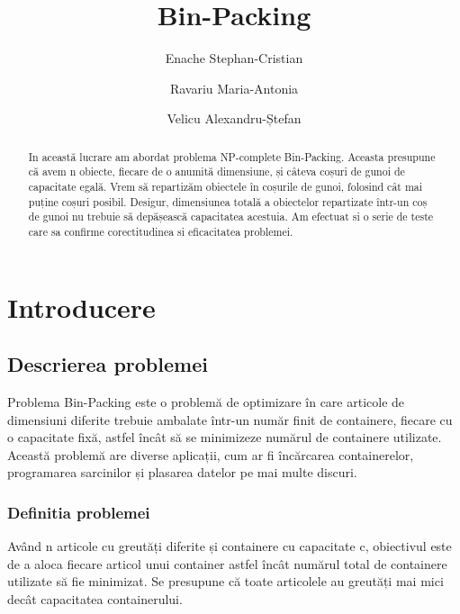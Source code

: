 \documentclass[runningheads]{llncs}
\begin{document}
	\title{Bin-Packing}

	\author{Enache Stephan-Cristian\and
		Ravariu Maria-Antonia\and
		Velicu Alexandru-Ștefan}

	\maketitle
	\begin{abstract}
		In această lucrare am abordat problema NP-complete Bin-Packing. Aceasta presupune că avem n obiecte, fiecare de o anumită dimensiune, și câteva coșuri de gunoi de capacitate egală. Vrem să repartizăm obiectele în coșurile de gunoi, folosind cât mai puține coșuri posibil. Desigur,
		dimensiunea totală a obiectelor repartizate într-un coș de gunoi nu trebuie să depășească capacitatea acestuia. Am efectuat si o serie de teste care sa confirme corectitudinea si eficacitatea problemei.

	\end{abstract}
	\section{Introducere}
	\subsection{Descrierea problemei}
	Problema Bin-Packing este o problemă de optimizare în care articole de dimensiuni diferite trebuie ambalate într-un număr finit de containere, fiecare cu o capacitate fixă, astfel încât să se minimizeze numărul de containere utilizate. Această problemă are diverse aplicații, cum ar fi încărcarea containerelor, programarea sarcinilor și plasarea datelor pe mai multe discuri.

	\subsubsection{Definitia problemei}
	Având n articole cu greutăți diferite și containere cu capacitate c, obiectivul este de a aloca fiecare articol unui container astfel încât numărul total de containere utilizate să fie minimizat. Se presupune că toate articolele au greutăți mai mici decât capacitatea containerului.
\end{document}
